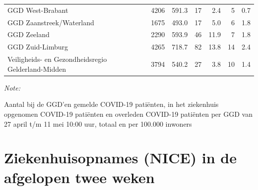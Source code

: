 \documentclass[
  english,
  man,floatsintext]{apa6}
\begin{document}
\begin{table}
\begin{threeparttable}
\begin{tabular}{lrrrrrr}
GGD West-Brabant & 4206 & 591.3 & 17 & 2.4 & 5 & 0.7\\
GGD Zaanstreek/Waterland & 1675 & 493.0 & 17 & 5.0 & 6 & 1.8\\
GGD Zeeland & 2290 & 593.9 & 46 & 11.9 & 7 & 1.8\\
GGD Zuid-Limburg & 4265 & 718.7 & 82 & 13.8 & 14 & 2.4\\
Veiligheids- en Gezondheidsregio Gelderland-Midden & 3794 & 540.2 & 27 & 3.8 & 10 & 1.4\\
\bottomrule
\end{tabular}
\begin{tablenotes}
\item \textit{Note: } 
\item Aantal bij de GGD’en gemelde COVID-19 patiënten, in het ziekenhuis opgenomen COVID-19 patiënten en overleden COVID-19 patiënten per GGD van 27 april t/m 11 mei 10:00 uur, totaal en per 100.000 inwoners
\end{tablenotes}
\end{threeparttable}
\endgroup{}
\end{table}

\newpage

\hypertarget{ziekenhuisopnames-nice-in-de-afgelopen-twee-weken}{%
\section{Ziekenhuisopnames (NICE) in de afgelopen twee weken}\label{ziekenhuisopnames-nice-in-de-afgelopen-twee-weken}}
\end{document}
